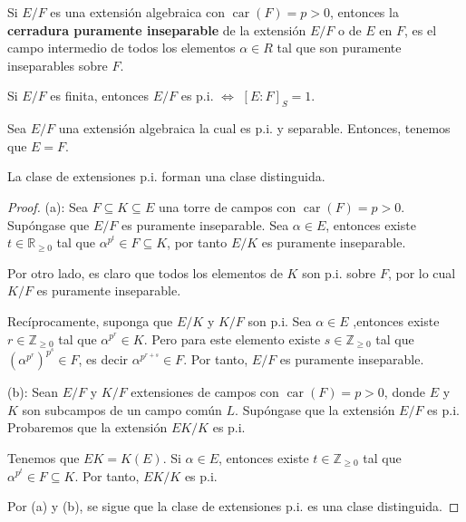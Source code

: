 \documentclass[12pt]{report}
\theoremstyle{largebreak}
\DeclareMathOperator{\car}{car}
\begin{document}
    \begin{mydef}
        Si $E/F$ es una extensión algebraica con $\car(F)=p>0$, entonces la \textbf{cerradura puramente inseparable} de la extensión $E/F$ o de $E$ en $F$, es el campo intermedio de todos los elementos $\alpha\in R$ tal que son puramente inseparables sobre $F$.
    \end{mydef}

    \begin{obs}
        Si $E/F$ es finita, entonces $E/F$ es p.i. $\iff$ $[E:F]_S=1$.
    \end{obs}

    \begin{obs}
        Sea $E/F$ una extensión algebraica la cual es p.i. y separable. Entonces, tenemos que $E=F$.
    \end{obs}

    \begin{theor}
        La clase de extensiones p.i. forman una clase distinguida.
    \end{theor}

    \begin{proof}
        (a): Sea $F\subseteq K\subseteq E$ una torre de campos con $\car(F)=p>0$. Supóngase que $E/F$ es puramente inseparable. Sea $\alpha\in E$, entonces existe $t\in\mathbb{R}_{\geq0}$ tal que $\alpha^{p^t}\in F\subseteq K$, por tanto $E/K$ es puramente inseparable.

        Por otro lado, es claro que todos los elementos de $K$ son p.i. sobre $F$, por lo cual $K/F$ es puramente inseparable.

        Recíprocamente, suponga que $E/K$ y $K/F$ son p.i. Sea $\alpha\in E$ ,entonces existe $r\in\mathbb{Z}_{\geq0}$ tal que $\alpha^{p^r}\in K$. Pero para este elemento existe $s\in\mathbb{Z}_{\geq0}$ tal que $(\alpha^{p^r})^{p^s}\in F$, es decir $\alpha^{p^{r+s}}\in F$. Por tanto, $E/F$ es puramente inseparable.

        (b): Sean $E/F$ y $K/F$ extensiones de campos con $\car(F)=p>0$, donde $E$ y $K$ son subcampos de un campo común $L$. Supóngase que la extensión $E/F$ es p.i. Probaremos que la extensión $EK/K$ es p.i.
        
        Tenemos que $EK=K(E)$. Si $\alpha\in E$, entonces existe $t\in\mathbb{Z}_{\geq0}$ tal que $\alpha^{p^t}\in F\subseteq K$. Por tanto, $EK/K$ es p.i.

        Por (a) y (b), se sigue que la clase de extensiones p.i. es una clase distinguida.
    \end{proof}
\end{document}
